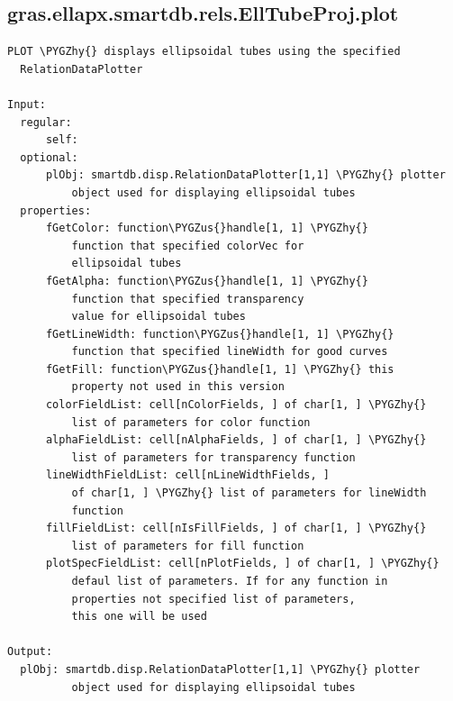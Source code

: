 \documentclass[letterpaper,10pt,english]{sphinxmanual}
\def\PYGZus{\char`\_}
\def\PYGZhy{\char`\-}
\begin{document}
\subsection{gras.ellapx.smartdb.rels.EllTubeProj.plot}
\label{chap_functions:gras-ellapx-smartdb-rels-elltubeproj-plot}
\begin{Verbatim}[commandchars=\\\{\}]
PLOT \PYGZhy{} displays ellipsoidal tubes using the specified
  RelationDataPlotter

Input:
  regular:
      self:
  optional:
      plObj: smartdb.disp.RelationDataPlotter[1,1] \PYGZhy{} plotter
          object used for displaying ellipsoidal tubes
  properties:
      fGetColor: function\PYGZus{}handle[1, 1] \PYGZhy{}
          function that specified colorVec for
          ellipsoidal tubes
      fGetAlpha: function\PYGZus{}handle[1, 1] \PYGZhy{}
          function that specified transparency
          value for ellipsoidal tubes
      fGetLineWidth: function\PYGZus{}handle[1, 1] \PYGZhy{}
          function that specified lineWidth for good curves
      fGetFill: function\PYGZus{}handle[1, 1] \PYGZhy{} this
          property not used in this version
      colorFieldList: cell[nColorFields, ] of char[1, ] \PYGZhy{}
          list of parameters for color function
      alphaFieldList: cell[nAlphaFields, ] of char[1, ] \PYGZhy{}
          list of parameters for transparency function
      lineWidthFieldList: cell[nLineWidthFields, ]
          of char[1, ] \PYGZhy{} list of parameters for lineWidth
          function
      fillFieldList: cell[nIsFillFields, ] of char[1, ] \PYGZhy{}
          list of parameters for fill function
      plotSpecFieldList: cell[nPlotFields, ] of char[1, ] \PYGZhy{}
          defaul list of parameters. If for any function in
          properties not specified list of parameters,
          this one will be used

Output:
  plObj: smartdb.disp.RelationDataPlotter[1,1] \PYGZhy{} plotter
          object used for displaying ellipsoidal tubes
\end{Verbatim}
\end{document}
